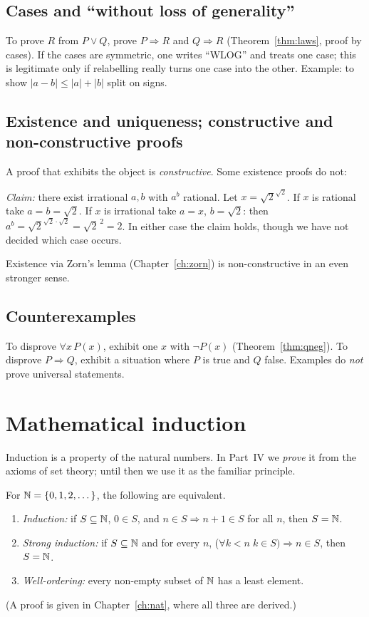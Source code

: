 \subsection{Cases and ``without loss of generality''}
To prove $R$ from $P\vee Q$, prove $P\Rightarrow R$ and $Q\Rightarrow R$ (Theorem~\ref{thm:laws}, proof by cases). If the cases are symmetric, one writes ``WLOG'' and treats one case; this is legitimate only if relabelling really turns one case into the other. Example: to show $|a-b|\le|a|+|b|$ split on signs.

\subsection{Existence and uniqueness; constructive and non-constructive proofs}
A proof that exhibits the object is \emph{constructive}. Some existence proofs do not:
\begin{example}
	\textit{Claim:} there exist irrational $a,b$ with $a^b$ rational. Let $x=\sqrt2^{\sqrt2}$. If $x$ is rational take $a=b=\sqrt2$. If $x$ is irrational take $a=x$, $b=\sqrt2$: then $a^b=\sqrt2^{\sqrt2\cdot\sqrt2}=\sqrt2^{\,2}=2$. In either case the claim holds, though we have not decided which case occurs.
\end{example}
Existence via Zorn's lemma (Chapter~\ref{ch:zorn}) is non-constructive in an even stronger sense.

\subsection{Counterexamples}
To disprove $\forall x\,P(x)$, exhibit one $x$ with $\neg P(x)$ (Theorem~\ref{thm:qneg}). To disprove $P\Rightarrow Q$, exhibit a situation where $P$ is true and $Q$ false. Examples do \emph{not} prove universal statements.

\section{Mathematical induction}

Induction is a property of the natural numbers. In Part~IV we \emph{prove} it from the axioms of set theory; until then we use it as the familiar principle.

\begin{theorem}\label{thm:induction-forms}
	For $\mathbb{N}=\{0,1,2,\dots\}$, the following are equivalent.
	\begin{enumerate}[label=(\alph*)]
		\item \emph{Induction:} if $S\subseteq\mathbb{N}$, $0\in S$, and $n\in S\Rightarrow n+1\in S$ for all $n$, then $S=\mathbb{N}$.
		\item \emph{Strong induction:} if $S\subseteq\mathbb{N}$ and for every $n$, ($\forall k<n\;k\in S)\Rightarrow n\in S$, then $S=\mathbb{N}$.
		\item \emph{Well-ordering:} every non-empty subset of $\mathbb{N}$ has a least element.
	\end{enumerate}
\end{theorem}
(A proof is given in Chapter~\ref{ch:nat}, where all three are derived.)

